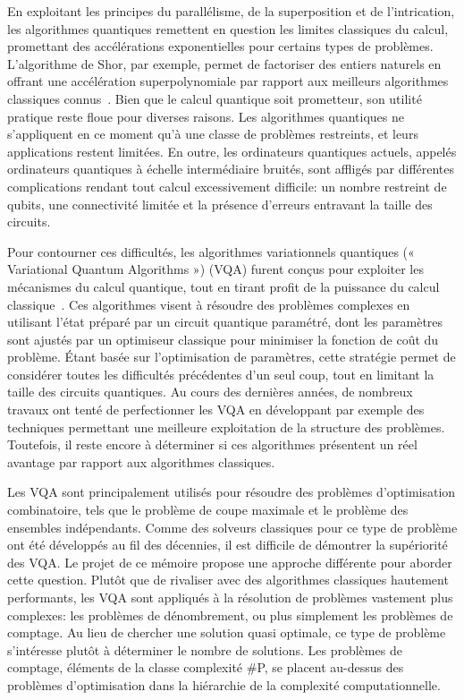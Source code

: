 \Introduction   %


En exploitant les principes du parallélisme, de la superposition et de l'intrication, les algorithmes quantiques remettent en question les limites classiques du calcul, promettant des accélérations exponentielles pour certains types de problèmes. L'algorithme de Shor, par exemple, permet de factoriser des entiers naturels en offrant une accélération superpolynomiale par rapport aux 
meilleurs algorithmes classiques connus~\cite{shorAlgorithmsQuantumComputation1994}. Bien que le calcul quantique soit prometteur, son utilité pratique reste floue pour diverses raisons. Les algorithmes quantiques ne s'appliquent en ce moment qu'à une classe de problèmes restreints, et leurs applications restent limitées. En outre, les ordinateurs quantiques actuels, appelés ordinateurs quantiques à échelle intermédiaire bruités, sont affligés par différentes complications rendant tout calcul excessivement difficile: un nombre restreint de qubits, une connectivité limitée et la présence d'erreurs entravant la taille des circuits.

Pour contourner ces difficultés, les algorithmes variationnels quantiques (« Variational Quantum Algorithms ») (VQA) furent conçus pour exploiter les mécanismes du calcul quantique, tout en tirant profit de la puissance du calcul classique~\cite{cerezoVariationalQuantumAlgorithms2021}. Ces algorithmes visent à résoudre des problèmes complexes en utilisant l'état préparé par un circuit quantique paramétré, dont les paramètres sont ajustés par un optimiseur classique pour minimiser la fonction de coût du problème. Étant basée sur l'optimisation de paramètres, cette stratégie permet de considérer toutes les difficultés précédentes d'un seul coup, tout en limitant la taille des circuits quantiques. Au cours des dernières années, de nombreux travaux ont tenté de perfectionner les VQA en développant par exemple des techniques permettant une meilleure exploitation de la structure des problèmes. Toutefois, il reste encore à déterminer si ces algorithmes présentent un réel avantage par rapport aux algorithmes classiques.  

Les VQA sont principalement utilisés pour résoudre des problèmes d'optimisation combinatoire, tels que le problème de coupe maximale et le problème des ensembles indépendants. Comme des solveurs classiques pour ce type de problème ont été développés au fil des décennies, il est difficile de démontrer la supériorité des VQA. Le projet de ce mémoire propose une approche différente pour aborder cette question. Plutôt que de rivaliser avec des algorithmes classiques hautement performants, les VQA sont appliqués à la résolution de problèmes vastement plus complexes: les problèmes de dénombrement, ou plus simplement les problèmes de comptage. Au lieu de chercher une solution quasi optimale, ce type de problème s'intéresse plutôt à déterminer le nombre de solutions. Les problèmes de comptage, éléments de la classe complexité \textsf{\#P}, se placent au-dessus des problèmes d'optimisation dans la hiérarchie de la complexité computationnelle.

